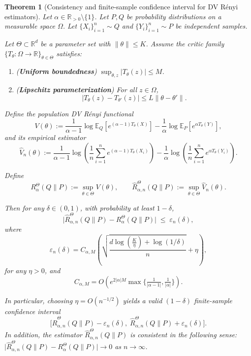 \documentclass[10pt,a4paper]{amsart}
\newtheorem{theorem}{Theorem}
\begin{document}
\begin{theorem}[Consistency and finite-sample confidence interval for DV R\'enyi estimators]
\label{thm:finite-sample-dv-renyi-app}
Let $\alpha\in\mathbb{R}_{> 0}\setminus\{1\}$.  
Let $P,Q$ be probability distributions on a measurable space $\Omega$.
Let $\{X_i\}_{i=1}^n \sim Q$ and $\{Y_i\}_{i=1}^n \sim P$ be independent samples.

Let $\Theta \subset \mathbb{R}^d$ be a parameter set with $\|\theta\|\le K$.
Assume the critic family $\{T_\theta:\Omega\to\mathbb{R}\}_{\theta\in\Theta}$ satisfies:
\begin{enumerate}
\item (\textbf{Uniform boundedness}) $\sup_{\theta,z}|T_\theta(z)| \le M$.
\item (\textbf{Lipschitz parameterization}) For all $z\in\Omega$,
\[
|T_\theta(z)-T_{\theta'}(z)| \le L \|\theta-\theta'\| .
\]
\end{enumerate}

Define the population DV R\'enyi functional
\[
V(\theta)
:=\frac{1}{\alpha-1}\log \mathbb{E}_{Q}\!\left[e^{(\alpha-1)T_\theta(X)}\right]
-\frac{1}{\alpha}\log \mathbb{E}_{P}\!\left[e^{\alpha T_\theta(Y)}\right],
\]
and its empirical estimator
\[
\widehat V_n(\theta)
:=\frac{1}{\alpha-1}\log\!\left(\frac{1}{n}\sum_{i=1}^n e^{(\alpha-1)T_\theta(X_i)}\right)
-\frac{1}{\alpha}\log\!\left(\frac{1}{n}\sum_{i=1}^n e^{\alpha T_\theta(Y_i)}\right).
\]

Define
\[
R_\alpha^{\Theta}(Q\|P):=\sup_{\theta\in\Theta} V(\theta),
\qquad
\widehat R_{\alpha,n}^{\Theta}(Q\|P):=\sup_{\theta\in\Theta} \widehat V_n(\theta).
\]

Then for any $\delta\in(0,1)$, with probability at least $1-\delta$,
\[
\big|\widehat R_{\alpha,n}^{\Theta}(Q\|P)-R_\alpha^{\Theta}(Q\|P)\big|
\;\le\;
\varepsilon_n(\delta),
\]
where
\[
\varepsilon_n(\delta)
=
C_{\alpha,M}
\left(
\sqrt{\frac{d\log\!\left(\frac{K}{\eta}\right)+\log(1/\delta)}{n}}
+
\eta
\right),
\]
for any $\eta>0$, and
\[
C_{\alpha,M}
=
O\!\left(
e^{2|\alpha|M}\max\Big\{\tfrac{1}{|\alpha-1|},\tfrac{1}{|\alpha|}\Big\}
\right).
\]

In particular, choosing $\eta = O(n^{-1/2})$ yields a valid $(1-\delta)$
finite-sample confidence interval
\[
\Big[
\widehat R_{\alpha,n}^{\Theta}(Q\|P)-\varepsilon_n(\delta),
\;
\widehat R_{\alpha,n}^{\Theta}(Q\|P)+\varepsilon_n(\delta)
\Big].
\]
In addition,
the estimator $\widehat R_{\alpha,n}^{\Theta}(Q\|P)$ is consistent in the following sense:
$\big|\widehat R_{\alpha,n}^{\Theta}(Q\|P)-R_\alpha^{\Theta}(Q\|P)\big|\rightarrow 0$ as $n\rightarrow\infty$.
\end{theorem}
\end{document}
